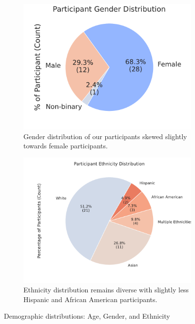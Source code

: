 \begin{figure}[h]
    \begin{subfigure}[b]{0.45\textwidth}
        \centering
        \includegraphics[width=\textwidth]{content/image/demo/demo_gender.pdf}
        \caption{Gender distribution of our participants skewed slightly towards female participants.}
        \label{fig:demoGender}
    \end{subfigure}
    \hfill
    \begin{subfigure}[b]{0.45\textwidth}
        \centering
        \includegraphics[width=\textwidth]{content/image/demo/demo_ethnicity.pdf}
        \caption{Ethnicity distribution remains diverse with slightly less Hispanic and African American participants.}
        \label{fig:demoEthnicity}
    \end{subfigure}
    
    \caption{Demographic distributions: Age, Gender, and Ethnicity}
    \label{fig:Demographics}
\end{figure}

